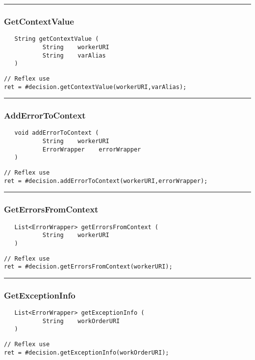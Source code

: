 \rule{15cm}{2pt}
\subsubsection{GetContextValue}
\label{Api:GetContextValue}
\begin{verbatim}
   String getContextValue (
           String    workerURI
           String    varAlias
   )
\end{verbatim}
\begin{lstlisting}[language=reflex]
// Reflex use
ret = #decision.getContextValue(workerURI,varAlias);
\end{lstlisting}



\rule{15cm}{2pt}
\subsubsection{AddErrorToContext}
\label{Api:AddErrorToContext}
\begin{verbatim}
   void addErrorToContext (
           String    workerURI
           ErrorWrapper    errorWrapper
   )
\end{verbatim}
\begin{lstlisting}[language=reflex]
// Reflex use
ret = #decision.addErrorToContext(workerURI,errorWrapper);
\end{lstlisting}



\rule{15cm}{2pt}
\subsubsection{GetErrorsFromContext}
\label{Api:GetErrorsFromContext}
\begin{verbatim}
   List<ErrorWrapper> getErrorsFromContext (
           String    workerURI
   )
\end{verbatim}
\begin{lstlisting}[language=reflex]
// Reflex use
ret = #decision.getErrorsFromContext(workerURI);
\end{lstlisting}



\rule{15cm}{2pt}
\subsubsection{GetExceptionInfo}
\label{Api:GetExceptionInfo}
\begin{verbatim}
   List<ErrorWrapper> getExceptionInfo (
           String    workOrderURI
   )
\end{verbatim}
\begin{lstlisting}[language=reflex]
// Reflex use
ret = #decision.getExceptionInfo(workOrderURI);
\end{lstlisting}



